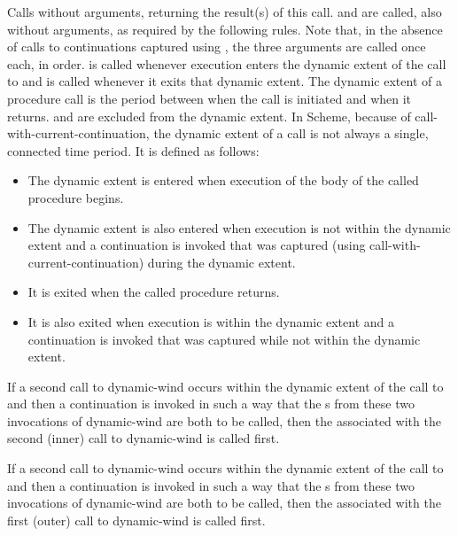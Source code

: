 \begin{entry}{%
}

Calls  without arguments, returning the result(s) of this call.
 and  are called, also without arguments, as required
by the following rules.  Note that, in the absence of calls to continuations
captured using , the three arguments are
called once each, in order.   is called whenever execution
enters the dynamic extent of the call to  and  is called
whenever it exits that dynamic extent.  The dynamic extent of a procedure
call is the period between when the call is initiated and when it
returns.   and  are excluded from the dynamic extent.
In Scheme, because of {\cf call-with-current-continuation}, the
dynamic extent of a call is not always a single, connected time period.
It is defined as follows:
\begin{itemize}
\item The dynamic extent is entered when execution of the body of the
called procedure begins.

\item The dynamic extent is also entered when execution is not within
the dynamic extent and a continuation is invoked that was captured
(using {\cf call-with-current-continuation}) during the dynamic extent.

\item It is exited when the called procedure returns.

\item It is also exited when execution is within the dynamic extent and
a continuation is invoked that was captured while not within the
dynamic extent.
\end{itemize}

If a second call to {\cf dynamic-wind} occurs within the dynamic extent of the
call to  and then a continuation is invoked in such a way that the
s from these two invocations of {\cf dynamic-wind} are both to be
called, then the  associated with the second (inner) call to
{\cf dynamic-wind} is called first.

If a second call to {\cf dynamic-wind} occurs within the dynamic extent of the
call to  and then a continuation is invoked in such a way that the
s from these two invocations of {\cf dynamic-wind} are both to be
called, then the  associated with the first (outer) call to
{\cf dynamic-wind} is called first.


\end{entry}
